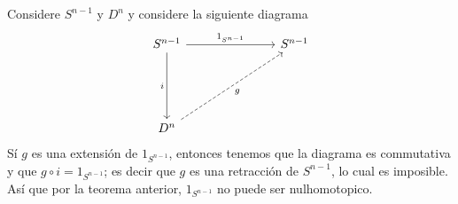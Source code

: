 \begin{example}\label{}
    Considere $S^{n-1}$ y $D^n$ y considere la siguiente diagrama
    \[\begin{tikzcd}
        {S^{n-1}} &&& {S^{n-1}} \\
        \\
        \\
        {D^n}
        \arrow["{1_{S^{n-1}}}", from=1-1, to=1-4]
        \arrow["i"', from=1-1, to=4-1]
        \arrow["g"', dashed, from=4-1, to=1-4]
    \end{tikzcd}\]
    S\'i $g$ es una extensi\'on de $1_{S^{n-1}}$, entonces tenemos que  la
    diagrama es commutativa y que $g \circ i=1_{S^{n-1}}$; es decir que $g$ es
    una retracci\'on de  $S^{n-1}$, lo cual es imposible. As\'i que por la
    teorema anterior, $1_{S^{n-1}}$ no puede ser nulhomotopico.
\end{example}
